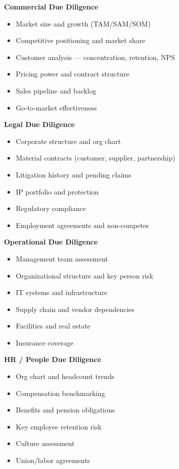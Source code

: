 \documentclass[11pt]{article}
\begin{document}
\textbf{Commercial Due Diligence}

\begin{itemize}[leftmargin=*,itemsep=2pt,topsep=2pt]
\item {} Market size and growth (TAM/SAM/SOM)
\item {} Competitive positioning and market share
\item {} Customer analysis — concentration, retention, NPS
\item {} Pricing power and contract structure
\item {} Sales pipeline and backlog
\item {} Go-to-market effectiveness
\end{itemize}

\textbf{Legal Due Diligence}

\begin{itemize}[leftmargin=*,itemsep=2pt,topsep=2pt]
\item {} Corporate structure and org chart
\item {} Material contracts (customer, supplier, partnership)
\item {} Litigation history and pending claims
\item {} IP portfolio and protection
\item {} Regulatory compliance
\item {} Employment agreements and non-competes
\end{itemize}

\textbf{Operational Due Diligence}

\begin{itemize}[leftmargin=*,itemsep=2pt,topsep=2pt]
\item {} Management team assessment
\item {} Organizational structure and key person risk
\item {} IT systems and infrastructure
\item {} Supply chain and vendor dependencies
\item {} Facilities and real estate
\item {} Insurance coverage
\end{itemize}

\textbf{HR / People Due Diligence}

\begin{itemize}[leftmargin=*,itemsep=2pt,topsep=2pt]
\item {} Org chart and headcount trends
\item {} Compensation benchmarking
\item {} Benefits and pension obligations
\item {} Key employee retention risk
\item {} Culture assessment
\item {} Union/labor agreements
\end{itemize}
\end{document}
